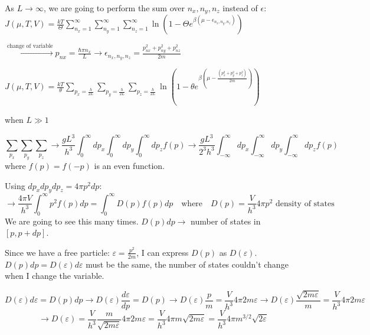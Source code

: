 \documentclass[12pt,a4paper]{report}
\newcommand{\esp}{\vspace{0.5cm}}
\begin{document}
	\esp
	
	As $L \to \infty$, we are going to perform the sum over $n_x, n_y, n_z$ instead of $\epsilon$:
	$J(\mu, T, V) = \frac{kT}{\Theta} \sum_{n_x=1}^\infty \sum_{n_y=1}^\infty \sum_{n_z=1}^\infty \ln(1 - \Theta e^{\beta(\mu - \epsilon_{n_x, n_y, n_z})})$
	
	\esp
	
	$\xrightarrow{\text{change of variable}} p_{nx} = \frac{\hbar \pi n_x}{L} \to \epsilon_{n_x, n_y, n_z} = \frac{p_{nx}^2 + p_{ny}^2 + p_{nz}^2}{2m}$
	
	\esp
	
	$J(\mu, T, V) = \frac{kT}{\theta} \sum_{p_x = \frac{h}{2L}} \sum_{p_y = \frac{h}{2L}} \sum_{p_z = \frac{h}{2L}} \ln (1 - \theta e^{\beta (\mu - \frac{(p_x^2 + p_y^2 + p_z^2)}{2m})})$
	
	\esp
	
	\noindent when $L \gg 1$
	
	\esp
	\begin{equation*}
		\sum_{p_x} \sum_{p_y} \sum_{p_z} \rightarrow \frac{g L^3}{h^3} \int_{0}^{\infty} dp_x \int_{0}^{\infty} dp_y \int_{0}^{\infty} dp_z f(p) \rightarrow \frac{g L^3}{2^3 h^3} \int_{-\infty}^{\infty} dp_x \int_{-\infty}^{\infty} dp_y \int_{-\infty}^{\infty} dp_z f(p) 
	\end{equation*}
	\noindent where $f(p) = f(-p)$ is an even function.
	
	\esp
	\noindent Using $dp_x dp_y dp_z = 4\pi p^2 dp$:
	\begin{equation*}
		\rightarrow \frac{4\pi V}{h^3} \int_{0}^{\infty} p^2 f(p) dp = \int_{0}^{\infty} D(p) f(p) dp \quad \text{where} \quad \boxed{D(p) = \frac{V}{h^3} 4\pi p^2} \text{ density of states}
	\end{equation*}
	We are going to see this many times. $D(p)dp \rightarrow$ number of states in $[p, p+dp]$.
	
	\esp
	Since we have a free particle: $\varepsilon = \frac{p^2}{2m}$, I can express $D(p)$ as $D(\varepsilon)$. $D(p)dp = D(\varepsilon)d\varepsilon$ must be the same, the number of states couldn't change when I change the variable.
	
	\esp
	\begin{equation*}
		D(\varepsilon)d\varepsilon = D(p)dp \rightarrow D(\varepsilon)\frac{d\varepsilon}{dp} = D(p) \rightarrow D(\varepsilon)\frac{p}{m} = \frac{V}{h^3} 4\pi 2m\varepsilon \rightarrow D(\varepsilon)\frac{\sqrt{2m\varepsilon}}{m} = \frac{V}{h^3} 4\pi 2m\varepsilon
	\end{equation*}
	\begin{equation*}
		\rightarrow D(\varepsilon) = \frac{V}{h^3} \frac{m}{\sqrt{2m\varepsilon}} 4\pi 2m\varepsilon = \frac{V}{h^3} 4\pi m \sqrt{2m\varepsilon} = \frac{V}{h^3} 4\pi m^{3/2} \sqrt{2\varepsilon}
	\end{equation*}
	
\end{document}
